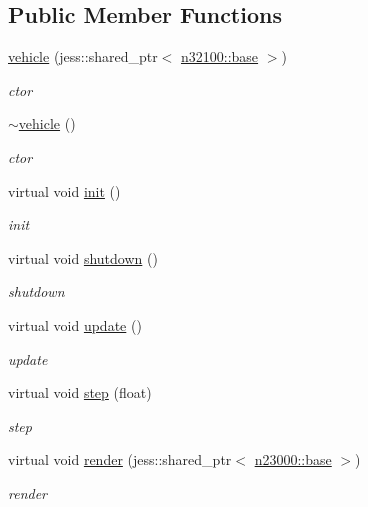 \subsection*{Public Member Functions}
\begin{DoxyCompactItemize}
\item 
\hyperlink{classnebula_1_1content_1_1actor_1_1admin_1_1vehicle_a2ff847d718ed428a8296df23eb953b3c}{vehicle} (jess::shared\_\-ptr$<$ \hyperlink{classnebula_1_1content_1_1scene_1_1admin_1_1base}{n32100::base} $>$)
\begin{DoxyCompactList}\small\item\em ctor \item\end{DoxyCompactList}\item 
\hyperlink{classnebula_1_1content_1_1actor_1_1admin_1_1vehicle_a2f2f76ea458ae6c445e2effdacefe76b}{$\sim$vehicle} ()
\begin{DoxyCompactList}\small\item\em ctor \item\end{DoxyCompactList}\item 
virtual void \hyperlink{classnebula_1_1content_1_1actor_1_1admin_1_1vehicle_affc4a941cb66e049f45e8de242c24535}{init} ()
\begin{DoxyCompactList}\small\item\em init \item\end{DoxyCompactList}\item 
virtual void \hyperlink{classnebula_1_1content_1_1actor_1_1admin_1_1vehicle_af9d76795459cf3acad5c5ec5a9b5b13b}{shutdown} ()
\begin{DoxyCompactList}\small\item\em shutdown \item\end{DoxyCompactList}\item 
virtual void \hyperlink{classnebula_1_1content_1_1actor_1_1admin_1_1vehicle_afbb178d770e59c7d211df86d63bb9303}{update} ()
\begin{DoxyCompactList}\small\item\em update \item\end{DoxyCompactList}\item 
virtual void \hyperlink{classnebula_1_1content_1_1actor_1_1admin_1_1vehicle_a3d1b3aec177cf3c759029a487b1c2c9d}{step} (float)
\begin{DoxyCompactList}\small\item\em step \item\end{DoxyCompactList}\item 
virtual void \hyperlink{classnebula_1_1content_1_1actor_1_1admin_1_1vehicle_adf96a8df29b0e524bad0fee36aad92b4}{render} (jess::shared\_\-ptr$<$ \hyperlink{classnebula_1_1platform_1_1renderer_1_1base}{n23000::base} $>$)
\begin{DoxyCompactList}\small\item\em render \item\end{DoxyCompactList}\end{DoxyCompactItemize}


